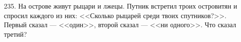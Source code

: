 235. На острове живут рыцари и лжецы. Путник встретил троих островитян и спросил каждого из них: <<Сколько рыцарей среди твоих спутников?>>. Первый сказал --- <<один>>,  второй сказал --- <<ни одного>>. Что сказал третий?\\
